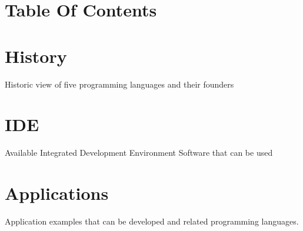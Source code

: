 \documentclass{article}
\begin{document}
 	\section{Table Of Contents}
	\section{History} 
	Historic view of  five programming languages and their founders 
	\section{IDE} 
	Available Integrated Development Environment Software that can be used
	\section{Applications} 
	 Application examples that can be developed and related programming languages.
	 
\end{document}
